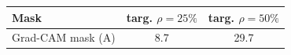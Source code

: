 \begin{tabular}{lcc}
\toprule
Mask & targ. $\rho=25\%$ & targ. $\rho=50\%$ \\
\midrule
Grad-CAM mask (A) & 8.7 & 29.7 \\
\bottomrule
\end{tabular}
